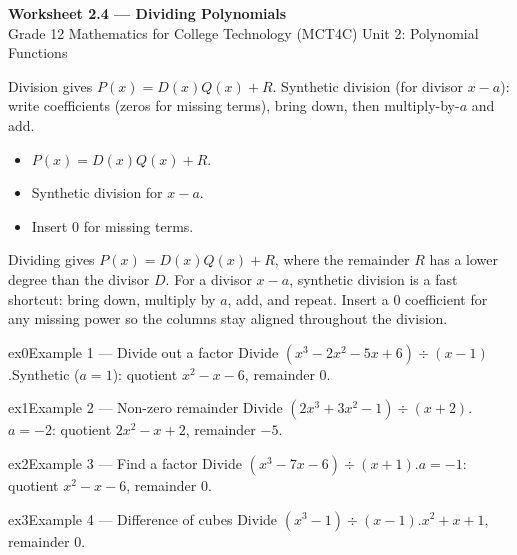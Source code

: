 \documentclass[11pt]{article}
\begin{document}
\begin{center}
{\LARGE\bfseries\color{titleblue}Worksheet 2.4 --- Dividing Polynomials}\\[2pt]
{\small Grade 12 Mathematics for College Technology (MCT4C) \textperiodcentered{} Unit 2: Polynomial Functions}
\end{center}

\begin{ideabox}
Division gives $P(x)=D(x)Q(x)+R$. Synthetic division (for divisor $x-a$): write coefficients (zeros for missing terms), bring down, then multiply-by-$a$ and add.
\begin{itemize}[leftmargin=*,itemsep=2pt]
  \item $P(x)=D(x)Q(x)+R$.
  \item Synthetic division for $x-a$.
  \item Insert $0$ for missing terms.
\end{itemize}
\end{ideabox}

\begin{learnbox}
Dividing gives $P(x)=D(x)Q(x)+R$, where the remainder $R$ has a lower degree than the divisor $D$.
For a divisor $x-a$, synthetic division is a fast shortcut: bring down, multiply by $a$, add, and repeat.
Insert a $0$ coefficient for any missing power so the columns stay aligned throughout the division.
\end{learnbox}


\begin{example}{ex0}{Example 1 --- Divide out a factor}
Divide $(x^3-2x^2-5x+6)\div(x-1)$.\soln Synthetic ($a=1$): quotient $x^2-x-6$, remainder $0$.
\end{example}

\begin{example}{ex1}{Example 2 --- Non-zero remainder}
Divide $(2x^3+3x^2-1)\div(x+2)$.\soln $a=-2$: quotient $2x^2-x+2$, remainder $-5$.
\end{example}

\begin{example}{ex2}{Example 3 --- Find a factor}
Divide $(x^3-7x-6)\div(x+1)$.\soln $a=-1$: quotient $x^2-x-6$, remainder $0$.
\end{example}

\begin{example}{ex3}{Example 4 --- Difference of cubes}
Divide $(x^3-1)\div(x-1)$.\soln $x^2+x+1$, remainder $0$.
\end{example}
\end{document}
